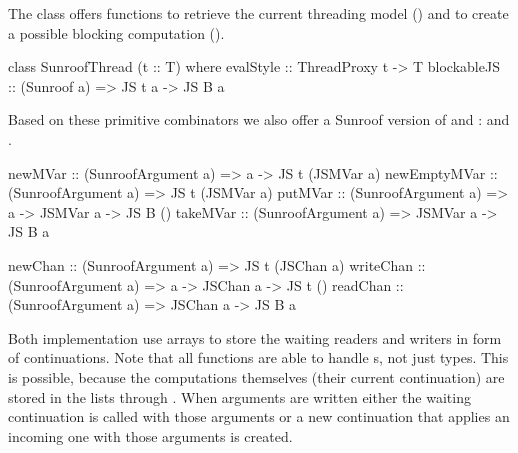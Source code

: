 The class  offers functions to retrieve the 
current threading model () and to create a possible
blocking computation ().
\begin{Code}
class SunroofThread (t :: T) where
  evalStyle   :: ThreadProxy t -> T
  blockableJS :: (Sunroof a) => JS t a -> JS B a
\end{Code}
Based on these primitive combinators we also offer a Sunroof 
version of  and :  and .
\begin{Code}
newMVar      :: (SunroofArgument a) => a -> JS t (JSMVar a)
newEmptyMVar :: (SunroofArgument a) => JS t (JSMVar a)
putMVar      :: (SunroofArgument a) => a -> JSMVar a -> JS B ()
takeMVar     :: (SunroofArgument a) => JSMVar a -> JS B a

newChan   :: (SunroofArgument a) => JS t (JSChan a)
writeChan :: (SunroofArgument a) => a -> JSChan a -> JS t ()
readChan  :: (SunroofArgument a) => JSChan a -> JS B a
\end{Code}
Both implementation use arrays to store the waiting readers and
writers in form of continuations. Note that all functions
are able to handle s, not just 
types. This is possible, because the computations themselves
(their current continuation) are
stored in the lists through .
When arguments are written either the waiting
continuation is called with those arguments or a new continuation 
that applies an incoming one with those arguments is created.

